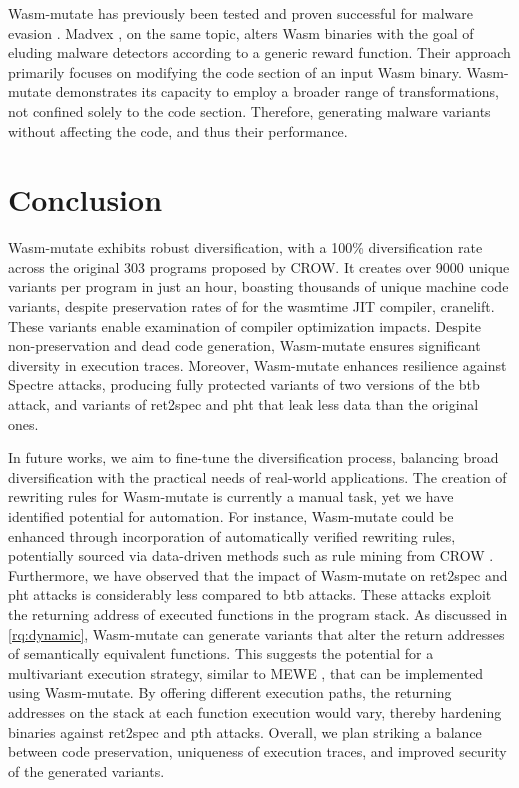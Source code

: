 \documentclass[sigplan,screen]{acmart}
\newcommand{\tool}{Wasm-mutate\xspace}
\begin{document}
\tool has previously been tested and proven successful for malware evasion \cite{CABRERAARTEAGA2023103296}.
Madvex \cite{madvex}, on the same topic, alters Wasm binaries with the goal of eluding malware detectors according to a generic reward function. 
Their approach primarily focuses on modifying the code section of an input Wasm binary. 
\tool demonstrates its capacity to employ a broader range of transformations, not confined solely to the code section.
Therefore, generating malware variants without affecting the code, and thus their performance.


\section{Conclusion}
\label{conc}

\tool exhibits robust diversification, with a 100\% diversification rate across the original 303 programs proposed by CROW. 
It creates over 9000 unique variants per program in just an hour, boasting thousands of unique machine code variants, despite preservation rates of \preserved for the wasmtime JIT compiler, cranelift. 
These variants enable examination of compiler optimization impacts.
Despite non-preservation and dead code generation, \tool ensures significant diversity in execution traces. 
Moreover, \tool enhances resilience against Spectre attacks, producing fully protected variants of two versions of the btb attack, and variants of ret2spec and pht that leak less data than the original ones.


In future works, we aim to fine-tune the diversification process, balancing broad diversification with the practical needs of real-world applications. 
The creation of rewriting rules for \tool is currently a manual task, yet we have identified potential for automation. 
For instance, \tool could be enhanced through incorporation of automatically verified rewriting rules, potentially sourced via data-driven methods such as rule mining from CROW \cite{10026577}.
Furthermore, we have observed that the impact of \tool on ret2spec and pht attacks is considerably less compared to btb attacks. 
These attacks exploit the returning address of executed functions in the program stack. 
As discussed in \ref{rq:dynamic}, \tool can generate variants that alter the return addresses of semantically equivalent functions. 
This suggests the potential for a multivariant execution strategy, similar to MEWE \cite{MEWE}, that can be implemented using \tool. 
By offering different execution paths, the returning addresses on the stack at each function execution would vary, thereby hardening binaries against ret2spec and pth attacks.
Overall, we plan striking a balance between code preservation, uniqueness of execution traces, and improved security of the generated variants.




\end{document}
